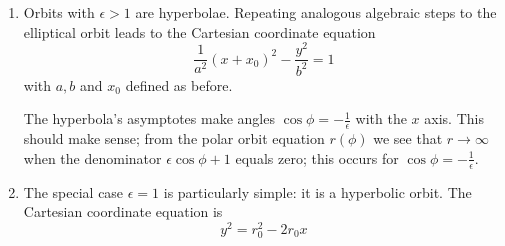 \documentclass[11pt, a4paper]{article}
\begin{document}
\begin{enumerate}
	\item Orbits with $ \epsilon > 1 $ are hyperbolae. Repeating analogous algebraic steps to the elliptical orbit leads to the Cartesian coordinate equation
	\begin{equation*}
		\frac{1}{a^{2}} (x + x_{0})^{2} - \frac{y^{2}}{b^{2}} = 1
	\end{equation*}
	with $ a, b $ and $ x_{0} $ defined as before. 
	
	The hyperbola's asymptotes make angles $ \cos \phi = -  \frac{1}{\epsilon} $ with the $ x $ axis. This should make sense; from the polar orbit equation $ r(\phi) $ we see that $ r \to \infty $ when the denominator $ \epsilon \cos \phi + 1 $ equals zero; this occurs for $ \cos \phi = -  \frac{1}{\epsilon} $.
	
	\item The special case $ \epsilon = 1 $ is particularly simple: it is a hyperbolic orbit. The Cartesian coordinate equation is
	\begin{equation*}
		y^{2} = r_{0}^{2} - 2r_{0}x
	\end{equation*} 
\end{enumerate}
\end{document}
